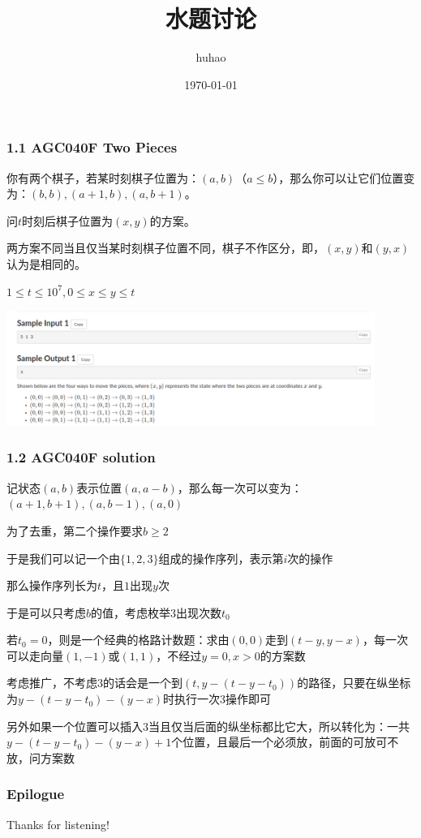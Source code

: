 \documentclass[10pt]{beamer}
\begin{document}
\title{水题讨论}
\date{\today}
\author{huhao}
\maketitle
\clearpage
\begin{frame}
	\frametitle{1.1 AGC040F Two Pieces}

	你有两个棋子，若某时刻棋子位置为：$(a,b)$（$a\le b$），那么你可以让它们位置变为：$(b,b),(a+1,b),(a,b+1)$。

	问$t$时刻后棋子位置为$(x,y)$的方案。

	两方案不同当且仅当某时刻棋子位置不同，棋子不作区分，即，$(x,y)$和$(y,x)$认为是相同的。

	$1\le t\le 10^7,0\le x\le y\le t$

	\includegraphics[width=0.9\textwidth]{1.png}

\end{frame}
\clearpage
\begin{frame}
	\frametitle{1.2 AGC040F solution}

	 记状态$(a,b)$表示位置$(a,a-b)$，那么每一次可以变为：$(a+1,b+1),(a,b-1),(a,0)$

	 为了去重，第二个操作要求$b\ge 2$

	 于是我们可以记一个由$\{1,2,3\}$组成的操作序列，表示第$i$次的操作

	 那么操作序列长为$t$，且$1$出现$y$次

	 于是可以只考虑$b$的值，考虑枚举$3$出现次数$t_0$

	 若$t_0=0$，则是一个经典的格路计数题：求由$(0,0)$走到$(t-y,y-x)$，每一次可以走向量$(1,-1)$或$(1,1)$，不经过$y=0,x>0$的方案数

	 考虑推广，不考虑$3$的话会是一个到$(t,y-(t-y-t_0))$的路径，只要在纵坐标为$y-(t-y-t_0)-(y-x)$时执行一次$3$操作即可

	 另外如果一个位置可以插入$3$当且仅当后面的纵坐标都比它大，所以转化为：一共$y-(t-y-t_0)-(y-x)+1$个位置，且最后一个必须放，前面的可放可不放，问方案数

\end{frame}
\clearpage
\begin{frame}
	\frametitle{Epilogue}

	\begin{center}
		\Huge Thanks for listening!
	\end{center}

\end{frame}
\end{document}
